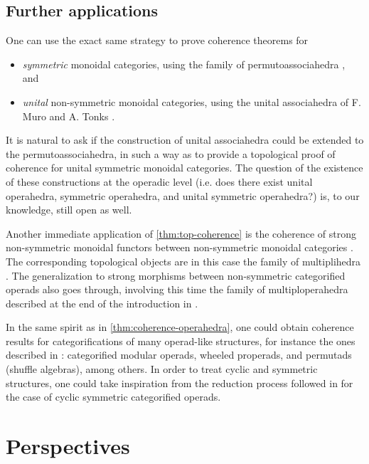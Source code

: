 \subsection{Further applications} 
\label{sec:further}
One can use the exact same strategy to prove coherence theorems for 
\begin{itemize}
    \item \emph{symmetric} monoidal categories, using the family of permutoassociahedra \cite{kapranov1993,reinerCoxeterassociahedra1994}, and
    \item \emph{unital} non-symmetric monoidal categories, using the unital associahedra of F. Muro and A. Tonks \cite{muroUnitalAssociahedra2014}.
\end{itemize}
It is natural to ask if the construction of unital associahedra could be extended to the permutoassociahedra, in such a way as to provide a topological proof of coherence for unital symmetric monoidal categories. 
The question of the existence of these constructions at the operadic level (i.e. does there exist unital operahedra, symmetric operahedra, and unital symmetric operahedra?) is, to our knowledge, still open as well. 

Another immediate application of \cref{thm:top-coherence} is the coherence of strong non-symmetric monoidal functors between non-symmetric monoidal categories \cite{epsteinFunctorsTensoredCategories1966}. 
The corresponding topological objects are in this case the family of multiplihedra \cite{Stasheff70,Forcey08}.
The generalization to strong morphisms between non-symmetric categorified operads also goes through, involving this time the family of multiploperahedra described at the end of the introduction in \cite{MazuirLA22}.

In the same spirit as in \cref{thm:coherence-operahedra}, one could obtain coherence results for categorifications of many operad-like structures, for instance the ones described in \cite{BMO20}: categorified modular operads, wheeled properads, and permutads (shuffle algebras), among others.
In order to treat cyclic and symmetric structures, one could take inspiration from the reduction process followed in \cite{curienCategorifiedCyclicOperads2020} for the case of cyclic symmetric categorified operads.


\section{Perspectives}


